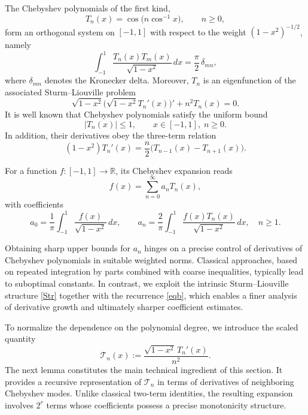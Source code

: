 \documentclass[12pt,a4paper]{article}
\begin{document}
The Chebyshev polynomials of the first kind,
\[
T_n(x)=\cos\bigl(n\cos^{-1}x\bigr), \qquad n\ge 0,
\]
form an orthogonal system on $[-1,1]$ with respect to the weight $(1-x^2)^{-1/2}$, namely
\[
\int_{-1}^{1}\frac{T_n(x)T_m(x)}{\sqrt{1-x^2}}\,dx=\frac{\pi}{2}\,\delta_{mn},
\]
where $\delta_{mn}$ denotes the Kronecker delta. Moreover, $T_n$ is an eigenfunction of the associated Sturm--Liouville problem \cite{Shen}
\begin{equation}\label{Str}
\sqrt{1-x^2}\bigl(\sqrt{1-x^2}T_n'(x)\bigr)'+n^2T_n(x)=0.
\end{equation}
It is well known that Chebyshev polynomials satisfy the uniform bound
\begin{equation}\label{bound}
|T_n(x)|\le 1,\qquad x\in[-1,1],\; n\ge 0.
\end{equation}
In addition, their derivatives obey the three-term relation \cite{Shen}
\begin{equation}\label{eqb}
(1-x^2)T_n'(x)=\frac{n}{2}\bigl(T_{n-1}(x)-T_{n+1}(x)\bigr).
\end{equation}

For a function $f\colon[-1,1]\to\mathbb{R}$, its Chebyshev expansion reads
\[
f(x)=\sum_{n=0}^{\infty}a_nT_n(x),
\]
with coefficients
\[
a_0=\frac{1}{\pi}\int_{-1}^{1}\frac{f(x)}{\sqrt{1-x^2}}\,dx,\qquad
a_n=\frac{2}{\pi}\int_{-1}^{1}\frac{f(x)T_n(x)}{\sqrt{1-x^2}}\,dx,\quad n\ge 1.
\]

Obtaining sharp upper bounds for $a_n$ hinges on a precise control of derivatives of
Chebyshev polynomials in suitable weighted norms. Classical approaches, based on
repeated integration by parts combined with coarse inequalities, typically lead to
suboptimal constants. In contrast, we exploit the intrinsic Sturm--Liouville structure
\eqref{Str} together with the recurrence \eqref{eqb}, which enables a finer analysis of
derivative growth and ultimately sharper coefficient estimates.

To normalize the dependence on the polynomial degree, we introduce the scaled quantity
\begin{equation}\label{sim}
\mathcal{T}_n(x):=\frac{\sqrt{1-x^2}\,T_n'(x)}{n^2}.
\end{equation}
The next lemma constitutes the main technical ingredient of this section. It provides
a recursive representation of $\mathcal{T}_n$ in terms of derivatives of neighboring
Chebyshev modes. Unlike classical two-term identities, the resulting expansion involves
$2^r$ terms whose coefficients possess a precise monotonicity structure.
\end{document}
